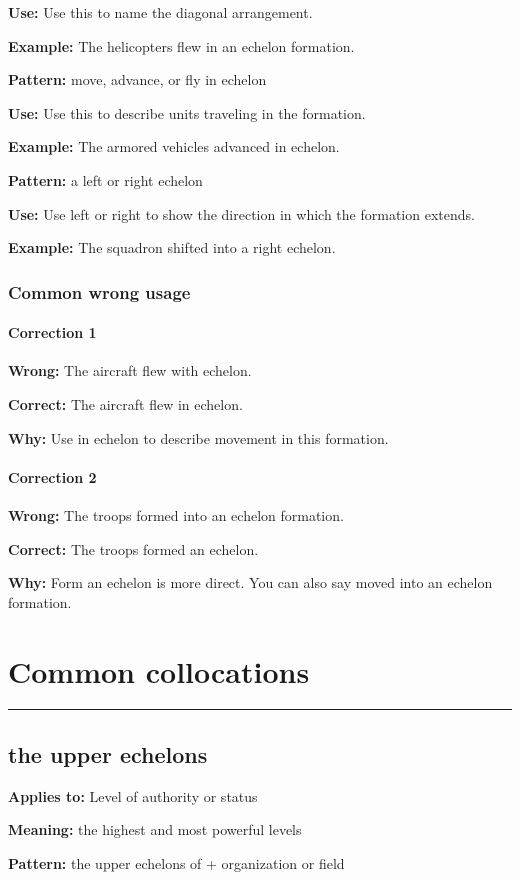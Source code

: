 \documentclass[11pt]{article}
\newcommand{\sectionrule}{\par\vspace{-0.5em}\noindent\textcolor{Accent}{\rule{\linewidth}{0.6pt}}\par}
\begin{document}
\textbf{Use:} Use this to name the diagonal arrangement.

\textbf{Example:} The helicopters flew in an echelon formation.

\textbf{Pattern:} move, advance, or fly in echelon

\textbf{Use:} Use this to describe units traveling in the formation.

\textbf{Example:} The armored vehicles advanced in echelon.

\textbf{Pattern:} a left or right echelon

\textbf{Use:} Use left or right to show the direction in which the formation extends.

\textbf{Example:} The squadron shifted into a right echelon.

\subsubsection{Common wrong usage}
\paragraph{Correction 1}
\textbf{Wrong:} The aircraft flew with echelon.

\textbf{Correct:} The aircraft flew in echelon.

\textbf{Why:} Use in echelon to describe movement in this formation.

\paragraph{Correction 2}
\textbf{Wrong:} The troops formed into an echelon formation.

\textbf{Correct:} The troops formed an echelon.

\textbf{Why:} Form an echelon is more direct. You can also say moved into an echelon formation.

\section{Common collocations}
\sectionrule
\subsection{the upper echelons}
\textbf{Applies to:} Level of authority or status

\textbf{Meaning:} the highest and most powerful levels

\textbf{Pattern:} the upper echelons of + organization or field
\end{document}
